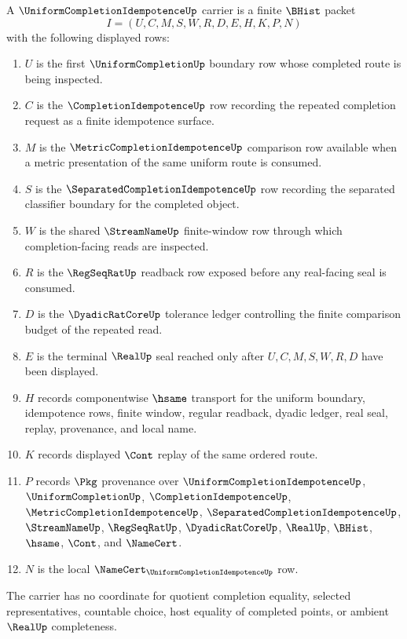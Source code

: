 \begin{definition}
\label{def:uniform-completion-idempotence-carrier}
A $\UniformCompletionIdempotenceUp$ carrier is a finite $\BHist$ packet
$$
I=(U,C,M,S,W,R,D,E,H,K,P,N)
$$
with the following displayed rows:
\begin{enumerate}
\item $U$ is the first $\UniformCompletionUp$ boundary row whose completed route is being inspected.
\item $C$ is the $\CompletionIdempotenceUp$ row recording the repeated completion request as a finite idempotence surface.
\item $M$ is the $\MetricCompletionIdempotenceUp$ comparison row available when a metric presentation of the same uniform route is consumed.
\item $S$ is the $\SeparatedCompletionIdempotenceUp$ row recording the separated classifier boundary for the completed object.
\item $W$ is the shared $\StreamNameUp$ finite-window row through which completion-facing reads are inspected.
\item $R$ is the $\RegSeqRatUp$ readback row exposed before any real-facing seal is consumed.
\item $D$ is the $\DyadicRatCoreUp$ tolerance ledger controlling the finite comparison budget of the repeated read.
\item $E$ is the terminal $\RealUp$ seal reached only after $U,C,M,S,W,R,D$ have been displayed.
\item $H$ records componentwise $\hsame$ transport for the uniform boundary, idempotence rows, finite window, regular readback, dyadic ledger, real seal, replay, provenance, and local name.
\item $K$ records displayed $\Cont$ replay of the same ordered route.
\item $P$ records $\Pkg$ provenance over $\UniformCompletionIdempotenceUp$, $\UniformCompletionUp$, $\CompletionIdempotenceUp$, $\MetricCompletionIdempotenceUp$, $\SeparatedCompletionIdempotenceUp$, $\StreamNameUp$, $\RegSeqRatUp$, $\DyadicRatCoreUp$, $\RealUp$, $\BHist$, $\hsame$, $\Cont$, and $\NameCert$.
\item $N$ is the local $\NameCert_{\UniformCompletionIdempotenceUp}$ row.
\end{enumerate}
The carrier has no coordinate for quotient completion equality, selected representatives, countable choice, host equality of completed points, or ambient $\RealUp$ completeness.
\end{definition}

